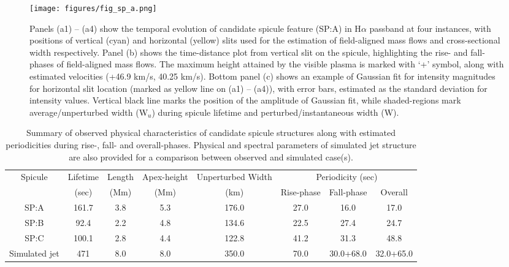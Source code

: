 \documentclass[12pt]{ociamthesis}
\begin{document}
\begin{figure*}
\texttt{[image: figures/fig\_sp\_a.png]}
\caption{Panels (a1) – (a4) show the temporal evolution of candidate spicule feature (SP:A) in H$\alpha$ passband at four instances, with positions of vertical (cyan) and horizontal (yellow) slits used for the estimation of field-aligned mass flows and cross-sectional width respectively. Panel (b) shows the time-distance plot from vertical slit on the spicule, highlighting the rise- and fall-phases of field-aligned mass flows. The maximum height attained by the visible plasma is marked with ‘+’ symbol, along with estimated velocities (+46.9 km/s, 40.25 km/s). Bottom panel (c) shows an example of Gaussian fit for intensity magnitudes for horizontal slit location (marked as yellow line on (a1) – (a4)), with error bars, estimated as the standard deviation for intensity values. Vertical black line marks the position of the amplitude of Gaussian fit, while shaded-regions mark average/unperturbed width (W$_{u}$) during spicule lifetime and perturbed/instantaneous width (W).}
\label{fig:1} 
\end{figure*}
\begin{table*}
\caption{Summary of observed physical characteristics of candidate spicule structures along with estimated periodicities during rise-, fall- and overall-phases. Physical and spectral parameters of simulated jet structure are also provided for a comparison between observed and simulated case(s). }             
\label{table:1}      
\begin{center}
\begin{tabular}{cccccccc}
\hline
Spicule       & Lifetime & Length & Apex-height & Unperturbed Width & \multicolumn{3}{c}{Periodicity (sec)} \\ \cline{6-8} 
              & (sec)    & (Mm)   & (Mm)        & (km)              & Rise-phase  & Fall-phase  & Overall   \\ \hline
SP:A          & 161.7    & 3.8    & 5.3         & 176.0             & 27.0        & 16.0        & 17.0      \\
SP:B          & 92.4     & 2.2    & 4.8         & 134.6             & 22.5        & 27.4        & 24.7      \\
SP:C          & 100.1    & 2.8    & 4.4         & 122.8             & 41.2        & 31.3        & 48.8      \\ \hline
Simulated jet & 471      & 8.0    & 8.0         & 350.0             & 70.0        & 30.0+68.0   & 32.0+65.0 \\ \hline
\end{tabular}
\end{center}
\end{table*}
\end{document}
